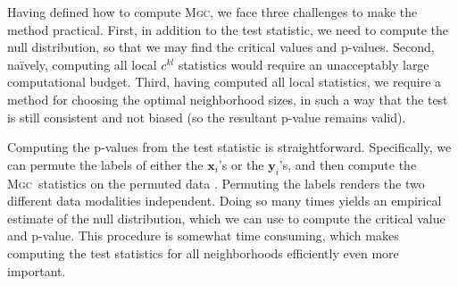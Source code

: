 \documentclass[11pt]{article}
\providecommand{\sct}[1]{{\normalfont\textsc{#1}}}
\providecommand{\mb}[1]{\boldsymbol{#1}}
\providecommand{\mc}[1]{\mathcal{#1}}
\newcommand{\G}{c}
\newcommand{\Mgc}{\sct{Mgc}}
\begin{document}
\clearpage
Having defined how to compute \Mgc, we face three challenges to make the method practical. First, in addition to the test statistic, we need to compute the null distribution, so that we may find the critical values and p-values.
Second, na\"ively, computing all local $\G^{kl}$ statistics would require an unacceptably large computational budget.
Third, having computed all local statistics, we require a method for choosing the optimal neighborhood sizes, in such a way that the test is still consistent and not biased (so the resultant p-value remains valid).

Computing the p-values from the test statistic is  straightforward.
Specifically, we can permute the labels of either the $\mb{x}_i$'s or the $\mb{y}_i$'s, and then compute the \Mgc~statistics on the permuted data \cite{GoodPermutationBook}.  Permuting the labels renders the two different data modalities  independent.  Doing so many times yields an empirical estimate of the null distribution, which we can use to compute the critical value and p-value. This procedure is somewhat time consuming, which makes computing the test statistics for all neighborhoods efficiently even more important.

\end{document}
